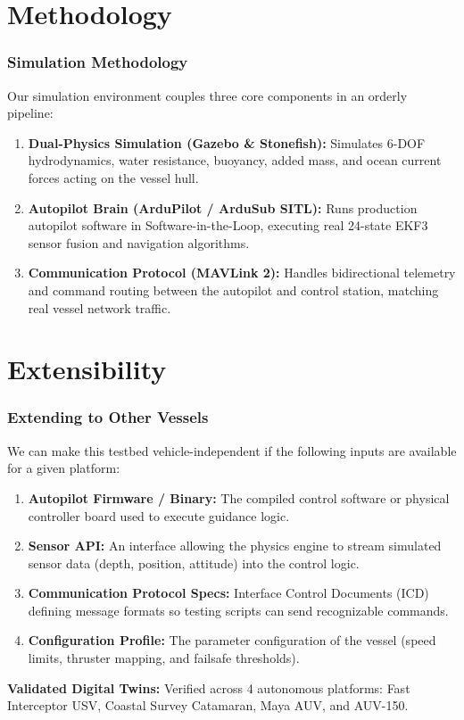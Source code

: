 \documentclass{beamer}
\begin{document}
\section{Methodology}
\begin{frame}
\frametitle{\textbf{Simulation Methodology}}
Our simulation environment couples three core components in an orderly pipeline:

\vspace{0.3cm}
\begin{enumerate}
    \item \textbf{Dual-Physics Simulation (Gazebo \& Stonefish):} Simulates 6-DOF hydrodynamics, water resistance, buoyancy, added mass, and ocean current forces acting on the vessel hull.
    \vspace{0.2cm}
    \item \textbf{Autopilot Brain (ArduPilot / ArduSub SITL):} Runs production autopilot software in Software-in-the-Loop, executing real 24-state EKF3 sensor fusion and navigation algorithms.
    \vspace{0.2cm}
    \item \textbf{Communication Protocol (MAVLink 2):} Handles bidirectional telemetry and command routing between the autopilot and control station, matching real vessel network traffic.
\end{enumerate}
\end{frame}

\section{Extensibility}
\begin{frame}
\frametitle{\textbf{Extending to Other Vessels}}
\small
We can make this testbed vehicle-independent if the following inputs are available for a given platform:

\vspace{0.2cm}
\begin{enumerate}
    \setlength\itemsep{0.2em}
    \item \textbf{Autopilot Firmware / Binary:} The compiled control software or physical controller board used to execute guidance logic.
    \item \textbf{Sensor API:} An interface allowing the physics engine to stream simulated sensor data (depth, position, attitude) into the control logic.
    \item \textbf{Communication Protocol Specs:} Interface Control Documents (ICD) defining message formats so testing scripts can send recognizable commands.
    \item \textbf{Configuration Profile:} The parameter configuration of the vessel (speed limits, thruster mapping, and failsafe thresholds).
\end{enumerate}

\vspace{0.2cm}
\footnotesize
\textbf{Validated Digital Twins:} Verified across 4 autonomous platforms: Fast Interceptor USV, Coastal Survey Catamaran, Maya AUV, and AUV-150.
\end{frame}
\end{document}
